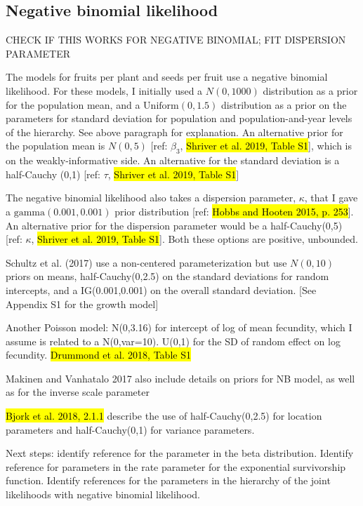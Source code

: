 \documentclass[12pt, oneside, titlepage]{article}   	%
\begin{document}
\iffalse


\subsection*{Negative binomial likelihood}
CHECK IF THIS WORKS FOR NEGATIVE BINOMIAL; FIT DISPERSION PARAMETER

The models for fruits per plant and seeds per fruit use a negative binomial likelihood. For these models, I initially used a $N(0,1000)$ distribution as a prior for the population mean, and a $\mathrm{Uniform}(0,1.5)$ distribution as a prior on the parameters for standard deviation for population and population-and-year levels of the hierarchy. See above paragraph for explanation. An alternative prior for the population mean is $N(0,5)$ [ref: $\beta_3$, \hl{Shriver et al. 2019, Table S1}], which is on the weakly-informative side. An alternative for the standard deviation is a half-Cauchy (0,1) [ref: $\tau$, \hl{Shriver et al. 2019, Table S1}]

 The negative binomial likelihood also takes a dispersion parameter, $\kappa$, that I gave a $\mathrm{gamma}(0.001,0.001)$ prior distribution [ref: \hl{Hobbs and Hooten 2015, p. 253}]. An alternative prior for the dispersion parameter would be a half-Cauchy(0,5) [ref: $\kappa$, \hl{Shriver et al. 2019, Table S1}]. Both these options are positive, unbounded. 

Schultz et al. (2017) use a non-centered parameterization but use $N(0,10)$ priors on means, half-Cauchy(0,2.5) on the standard deviations for random intercepts, and a IG(0.001,0.001) on the overall standard deviation. [See Appendix S1 for the growth model]

Another Poisson model: N(0,3.16) for intercept of log of mean fecundity, which I assume is related to a N(0,var=10). U(0,1) for the SD of random effect on log fecundity. \hl{Drummond et al. 2018, Table S1}

Makinen and Vanhatalo 2017 also include details on priors for NB model, as well as for the inverse scale parameter

\hl{Bjork et al. 2018, 2.1.1} describe the use of half-Cauchy(0,2.5) for location parameters and half-Cauchy(0,1) for variance parameters.

Next steps: identify reference for the parameter in the beta distribution. Identify reference for parameters in the rate parameter for the exponential survivorship function. Identify references for the parameters in the hierarchy of the joint likelihoods with negative binomial likelihood. 
\end{document}
